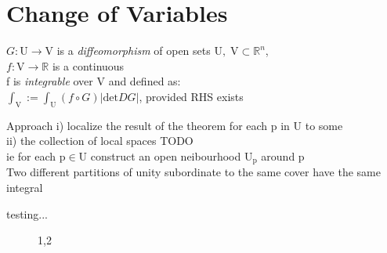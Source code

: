 \documentclass[letterpaper,11pt]{extarticle}
\begin{document}
\section{Change of Variables}
\LET
$G:\mathrm{U}\to\mathrm{V}$ is a \textit{diffeomorphism} of open sets 
$\mathrm{U},\;\mathrm{V}\subset\mathbb{R}^n$,\\
\IF $f:\mathrm{V}\to\mathbb{R}$ is a continuous\\
\THEN f is \textit{integrable} over V and defined as:\\
$\int_{\mathrm{V}}:=\int_{\mathrm{U}}(f\circ G)|\text{det}DG|$, provided RHS exists

Approach
i) localize the result of the theorem for each p in U to some \\
ii) the collection of local spaces TODO\\
ie for each $\mathrm{p}\in\mathrm{U}$ construct an open neibourhood $\mathrm{U}_{\mathrm{p}}$ around p\\

\IDEA
Two different partitions of unity subordinate to the same cover have the same integral




\begin{description}
\item[testing...] 1,2 
\end{description}
\end{document}
